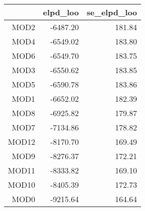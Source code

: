 \begin{table}[ht]
\centering
\begin{tabular}{rrr}
  \hline
 & elpd\_loo & se\_elpd\_loo \\ 
  \hline
MOD2 & -6487.20 & 181.84 \\ 
  MOD4 & -6549.02 & 183.80 \\ 
  MOD6 & -6549.70 & 183.75 \\ 
  MOD3 & -6550.62 & 183.85 \\ 
  MOD5 & -6590.78 & 183.86 \\ 
  MOD1 & -6652.02 & 182.39 \\ 
  MOD8 & -6925.82 & 179.87 \\ 
  MOD7 & -7134.86 & 178.82 \\ 
  MOD12 & -8170.70 & 169.49 \\ 
  MOD9 & -8276.37 & 172.21 \\ 
  MOD11 & -8333.82 & 169.10 \\ 
  MOD10 & -8405.39 & 172.73 \\ 
  MOD0 & -9215.64 & 164.64 \\ 
   \hline
\end{tabular}
\end{table}
